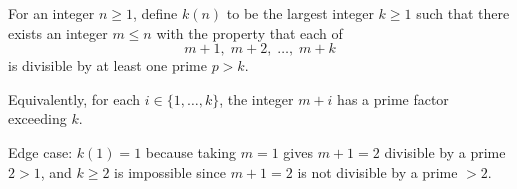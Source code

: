 For an integer $n\ge 1$, define $k(n)$ to be the largest integer $k\ge 1$ such that there exists an integer $m\le n$ with the property that each of
\[
 m+1,\;m+2,\;\dots,\;m+k
\]
is divisible by at least one prime $p>k$.

Equivalently, for each $i\in\{1,\dots,k\}$, the integer $m+i$ has a prime factor exceeding $k$.

Edge case: $k(1)=1$ because taking $m=1$ gives $m+1=2$ divisible by a prime $2>1$, and $k\ge 2$ is impossible since $m+1=2$ is not divisible by a prime $>2$.
